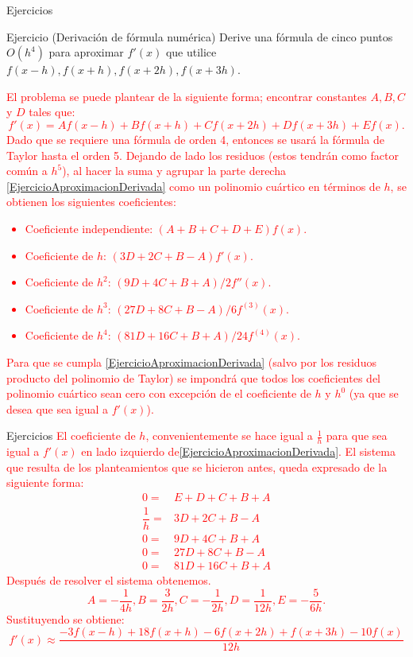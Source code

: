 \begin{frame}{Ejercicios}
\small
\begin{block}{Ejercicio (Derivación de fórmula numérica)}
Derive una fórmula de cinco puntos $O(h^4)$ para aproximar $f'(x)$ que utilice $f(x-h),f(x+h),f(x+2h),f(x+3h)$.  
\end{block}
\textcolor{red}{\indent El problema se puede plantear de la siguiente forma; encontrar constantes $A,B,C$ y $D$ tales que:
\begin{equation}\label{EjercicioAproximacionDerivada}
f'(x)= Af(x-h)+Bf(x+h)+Cf(x+2h)+Df(x+3h)+Ef(x).
\end{equation}
\indent Dado que se requiere una fórmula de orden 4, entonces se usará la fórmula de Taylor hasta el orden 5. Dejando de lado los residuos (estos tendrán como factor común a $h^5$), al hacer la suma y agrupar la parte derecha \eqref{EjercicioAproximacionDerivada} como un polinomio cuártico en términos de $h$, se obtienen los siguientes coeficientes:
\begin{itemize}
\item Coeficiente independiente: $(A+B+C+D+E)f(x)$.
\item Coeficiente de $h$: $(3D+2C+B-A)f'(x)$.
\item Coeficiente de $h^2$: $(9D+4C+B+A)/2f''(x)$.
\item Coeficiente de $h^3$: $(27D+8C+B-A)/6f^{(3)}(x)$.
\item Coeficiente de $h^4$: $(81D+16C+B+A)/24f^{(4)}(x)$.
\end{itemize}
\indent Para que se cumpla \eqref{EjercicioAproximacionDerivada} (salvo por los residuos producto del polinomio de Taylor) se impondrá que todos los coeficientes del polinomio cuártico sean cero con excepción de el coeficiente de $h$ y $h^0$ (ya que se desea que sea igual a $f'(x)$).}
\end{frame}
\begin{frame}{Ejercicios}
\textcolor{red}{
\indent 
El coeficiente de $h$, convenientemente se hace igual a  $\frac{1}{h}$ para que sea igual a $f'(x)$ en lado izquierdo de\eqref{EjercicioAproximacionDerivada}. El sistema que resulta de los planteamientos que se hicieron antes, queda expresado de la siguiente forma:
\begin{align*}
0=&E+D+C+B+A\\
\dfrac{1}{h}=&3D+2C+B-A\\
0=&9D+4C+B+A\\
0=&27D+8C+B-A\\
0=&81D+16C+B+A
\end{align*}
\indent Después de resolver el sistema obtenemos.
$$A=-\dfrac{1}{4h},B=\dfrac{3}{2h},C=-\dfrac{1}{2h},D=\dfrac{1}{12h},E=-\dfrac{5}{6h}.$$
\indent Sustituyendo se obtiene:
$$f'(x)\approx\dfrac{-3f(x-h)+18f(x+h)-6f(x+2h)+f(x+3h)-10f(x)}{12h}$$
}
\end{frame}